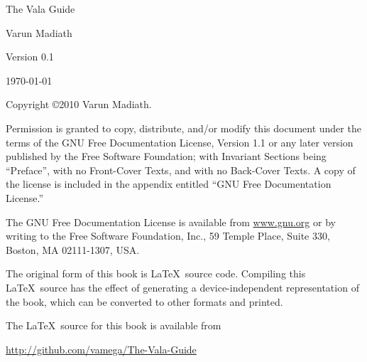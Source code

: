 \documentclass[openany]{book}
\begin{document}
\pagebreak
\thispagestyle{empty}

\begin{flushright}
\vspace*{2.5in}

{\huge The Vala Guide}

\vspace{1in}

{\Large
Varun Madiath
}


\vspace{1in}

{\Large Version 0.1}

{\small \today}

\vfill

\end{flushright}

\pagebreak
\thispagestyle{empty}

Copyright \copyright 2010 Varun Madiath.

\vspace{0.25in}

Permission is granted to copy, distribute, and/or modify this document
under the terms of the GNU Free Documentation License, Version 1.1 or
any later version published by the Free Software Foundation; with
Invariant Sections being ``Preface'', with no Front-Cover Texts, and
with no Back-Cover Texts.  A copy of the license is included in the
appendix entitled ``GNU Free Documentation License.''

The GNU Free Documentation License is available from \url{www.gnu.org}
or by writing to the Free Software Foundation, Inc., 59 Temple Place,
Suite 330, Boston, MA 02111-1307, USA.

The original form of this book is \LaTeX\ source code.  Compiling this
\LaTeX\ source has the effect of generating a device-independent
representation of the book, which can be converted to other formats
and printed.

The \LaTeX\ source for this book is available from

\hspace{0.25in}\url{http://github.com/vamega/The-Vala-Guide}

\vspace{0.25in}


\end{document}
